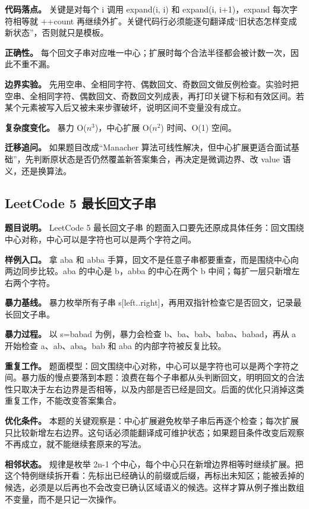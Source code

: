 \textbf{代码落点。} 关键是对每个 i 调用 expand(i, i) 和 expand(i, i+1)，expand 每次字符相等就 ++count 再继续外扩。关键代码行必须能逐句翻译成“旧状态怎样变成新状态”，否则就只是模板。

\textbf{正确性。} 每个回文子串对应唯一中心；扩展时每个合法半径都会被计数一次，因此不重不漏。

\textbf{边界实验。} 先用空串、全相同字符、偶数回文、奇数回文做反例检查。实验时把空串、全相同字符、偶数回文、奇数回文列成表，再打印关键下标和有效区间。若某个元素被写入后又被未来步骤破坏，说明区间不变量没有成立。

\textbf{复杂度变化。} 暴力 O(\ensuremath{n^{3}})，中心扩展 O(\ensuremath{n^{2}}) 时间、O(1) 空间。

\textbf{迁移追问。} 如果题目改成“Manacher 算法可线性解决，但中心扩展更适合面试基础”，先判断原状态是否仍然覆盖新答案集合，再决定是微调边界、改 value 语义，还是换算法。

\subsection{LeetCode 5 最长回文子串}

\textbf{题目说明。} LeetCode 5 最长回文子串 的题面入口要先还原成具体任务：回文围绕中心对称，中心可以是字符也可以是两个字符之间。

\textbf{样例入口。} 拿 aba 和 abba 手算，回文不是任意子串都要重查，而是围绕中心向两边同步比较。aba 的中心是 b，abba 的中心在两个 b 中间；每扩一层只新增左右两个字符。

\textbf{暴力基线。} 暴力枚举所有子串 s[left..right]，再用双指针检查它是否回文，记录最长回文子串。

\textbf{暴力过程。} 以 s=babad 为例，暴力会检查 b、ba、bab、baba、babad，再从 a 开始检查 a、ab、aba。bab 和 aba 的内部字符被反复比较。

\textbf{重复工作。} 题面模型：回文围绕中心对称，中心可以是字符也可以是两个字符之间。暴力版的慢点要落到本题：浪费在每个子串都从头判断回文，明明回文的合法性只取决于左右边界是否相等，以及内部是否已经是回文。后面的优化只消掉这类重复工作，不能改变答案集合。

\textbf{优化条件。} 本题的关键观察是：中心扩展避免枚举子串后再逐个检查；每次扩展只比较新增左右边界。这句话必须能翻译成可维护状态；如果题目条件改变后观察不再成立，就不能继续套原来的写法。

\textbf{相邻状态。} 规律是枚举 2n-1 个中心，每个中心只在新增边界相等时继续扩展。把这个特例继续拆开看：先标出已经确认的前缀或后缀，再标出未知区；能被丢掉的候选，必须是以后再也不会改变已确认区域语义的候选。这样才算从例子推出数组不变量，而不是只记一次操作。

